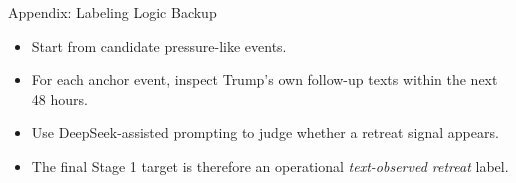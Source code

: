 \begin{frame}{Appendix: Labeling Logic Backup}
  \begin{itemize}
    \item Start from candidate pressure-like events.
    \item For each anchor event, inspect Trump's own follow-up texts within the next 48 hours.
    \item Use DeepSeek-assisted prompting to judge whether a retreat signal appears.
    \item The final Stage 1 target is therefore an operational \textit{text-observed retreat} label.
  \end{itemize}
\end{frame}

